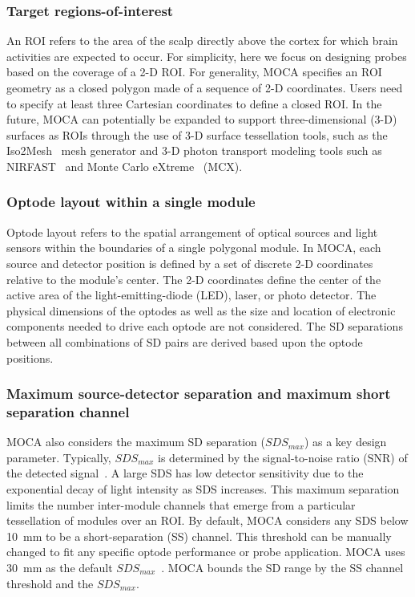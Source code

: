 \subsubsection{Target regions-of-interest}
An ROI refers to the area of the scalp directly above the cortex for which brain activities are expected to occur\cite{Hiroyasu2015}. For simplicity, here we focus on designing probes based on the coverage of a 2-D ROI. For generality, MOCA specifies an ROI geometry as a closed polygon made of a sequence of 2-D coordinates. Users need to specify at least three Cartesian coordinates to define a closed ROI. In the future, MOCA can potentially be expanded to support three-dimensional (3-D) surfaces as ROIs through the use of 3-D surface tessellation tools, such as the Iso2Mesh~\cite{Fang2009a} mesh generator and 3-D photon transport modeling tools such as NIRFAST~\cite{Nirfast} and Monte Carlo eXtreme~\cite{Fang2009} (MCX).

\subsubsection{Optode layout within a single module}
Optode layout refers to the spatial arrangement of optical sources and light sensors within the boundaries of a single polygonal module. In MOCA, each source and detector position is defined by a set of discrete 2-D coordinates relative to the module's center. The 2-D coordinates define the center of the active area of the light-emitting-diode (LED), laser, or photo detector. The physical dimensions of the optodes as well as the size and location of electronic components needed to drive each optode are not considered. The SD separations between all combinations of SD pairs are derived based upon the optode positions.

\subsubsection{Maximum source-detector separation and maximum short separation channel}
MOCA also considers the maximum SD separation ($SDS_{max}$) as a key design parameter. Typically, $SDS_{max}$ is determined by the signal-to-noise ratio (SNR) of the detected signal~\cite{Arnulphi2009}. A large SDS has low detector sensitivity due to the exponential decay of light intensity as SDS increases. This maximum separation limits the number inter-module channels that emerge from a particular tessellation of modules over an ROI. By default, MOCA considers any SDS below 10~mm to be a short-separation (SS) channel. This threshold can be manually changed to fit any specific optode performance or probe application. MOCA uses 30~mm as the default $SDS_{max}$~\cite{Taga2007, LloydFox2010}. MOCA bounds the SD range by the SS channel threshold and the $SDS_{max}$. 

